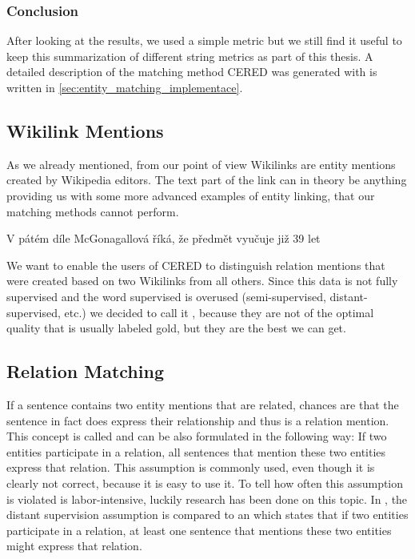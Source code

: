 

\subsubsection{Conclusion}
After looking at the results, we used a simple metric but we still find it useful to keep this summarization of different string metrics as part of this thesis. A detailed description of the matching method CERED was generated with is written in \autoref{sec:entity_matching_implementace}.


\subsection{Wikilink Mentions}

As we already mentioned, from our point of view Wikilinks are entity mentions created by Wikipedia editors. The text part of the link can in theory be anything providing us with some more advanced examples of entity linking, that our matching methods cannot perform.

V pátém díle McGonagallová říká, že předmět vyučuje již 39 let

We want to enable the users of CERED to distinguish relation mentions that were created based on two Wikilinks from all others. Since this data is not fully supervised and the word supervised is overused (semi-supervised, distant-supervised, etc.) we decided to call it , because they are not of the optimal quality that is usually labeled gold, but they are the best we can get.


\subsection{Relation Matching}
If a sentence contains two entity mentions that are related, chances are that the sentence in fact does express their relationship and thus is a relation mention. This concept is called  and can be also formulated in the following way: If two entities participate in a relation, all sentences that  mention these two entities express that relation. This assumption is commonly used, even though it is clearly not correct, because it is easy to use it. To tell how often this assumption is violated is labor-intensive, luckily research has been done on this topic. In \cite{nytdistant}, the distant supervision assumption is compared to an  which states that if two entities participate in a relation, at least one sentence that mentions these two entities might express that relation. 

